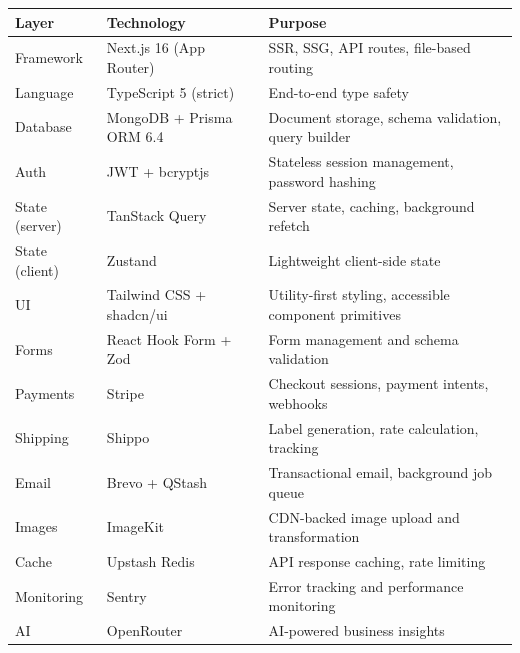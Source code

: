 \documentclass[12pt,onecolumn]{IEEEtran}
\begin{document}
\begin{center}
\begin{tabularx}{\textwidth}{llX}
  \toprule
  \textbf{Layer} & \textbf{Technology} & \textbf{Purpose} \\
  \midrule
  Framework    & Next.js 16 (App Router) & SSR, SSG, API routes, file-based routing \\
  Language     & TypeScript 5 (strict)   & End-to-end type safety \\
  Database     & MongoDB + Prisma ORM 6.4 & Document storage, schema validation, query builder \\
  Auth         & JWT + bcryptjs           & Stateless session management, password hashing \\
  State (server) & TanStack Query         & Server state, caching, background refetch \\
  State (client) & Zustand                & Lightweight client-side state \\
  UI           & Tailwind CSS + shadcn/ui & Utility-first styling, accessible component primitives \\
  Forms        & React Hook Form + Zod    & Form management and schema validation \\
  Payments     & Stripe                   & Checkout sessions, payment intents, webhooks \\
  Shipping     & Shippo                   & Label generation, rate calculation, tracking \\
  Email        & Brevo + QStash           & Transactional email, background job queue \\
  Images       & ImageKit                 & CDN-backed image upload and transformation \\
  Cache        & Upstash Redis            & API response caching, rate limiting \\
  Monitoring   & Sentry                   & Error tracking and performance monitoring \\
  AI           & OpenRouter               & AI-powered business insights \\
  \bottomrule
\end{tabularx}
\end{center}

\end{document}
